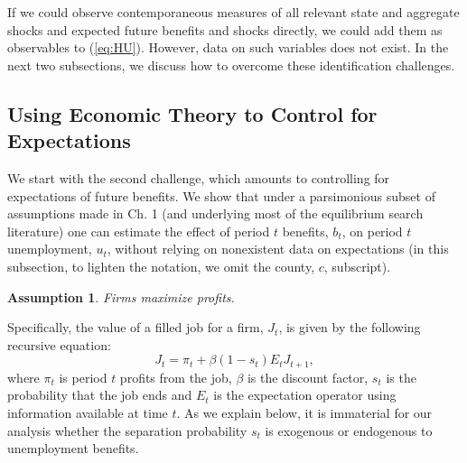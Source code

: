\documentclass[12pt]{article}
\newcommand{\1}{\mathbf{1}}
\newtheorem{assumption}{Assumption}
\begin{document}
If we could observe contemporaneous measures of all relevant state and aggregate shocks and expected future benefits and shocks directly, we could add them as observables to (\ref{eq:HU}). However, data on such variables does not exist. In the next two subsections, we discuss how to overcome these identification challenges.


\subsection{ \hspace{-.4cm} Using Economic Theory to Control for Expectations}
\label{sec:qd}
We start with the second challenge, which amounts to controlling for expectations of future benefits. We show that under a parsimonious subset of assumptions made in \citet{pissarides:00} Ch. 1 (and underlying most of the equilibrium search literature) one can estimate the effect of period $t$ benefits, $b_t$, on period $t$ unemployment, $u_t$, without relying on nonexistent data on expectations (in this subsection, to lighten the notation, we omit the county, $c$, subscript). 



\begin{assumption}\label{ass:firm_optimization}
    Firms maximize profits. 
\end{assumption}
Specifically, the value of a filled job for a firm, $J_t$, is given by the following recursive equation:
\begin{equation} \label{eq:Bellman_profit}
J_t = \pi_t + \beta(1-s_t) E_t J_{t+1},
\end{equation}
where $\pi_t$ is period $t$ profits from the job, $\beta$ is the discount factor, $s_t$ is the probability that the job ends and $E_t$ is the expectation operator using information available at time $t$. As we explain below, it is immaterial for our analysis whether the separation probability $s_t$ is exogenous or endogenous to unemployment benefits.
\end{document}
